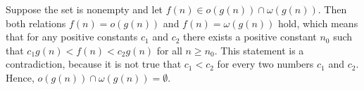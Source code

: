 Suppose the set is nonempty and let $f(n)\in o(g(n))\cap\omega(g(n))$.
Then both relations $f(n)=o(g(n))$ and $f(n)=\omega(g(n))$ hold, which means that for any positive constants $c_1$ and $c_2$ there exists a positive constant $n_0$ such that $c_1g(n)<f(n)<c_2g(n)$ for all $n\ge n_0$.
This statement is a contradiction, because it is not true that $c_1<c_2$ for every two numbers $c_1$ and $c_2$.
Hence, $o(g(n))\cap\omega(g(n))=\emptyset$.
